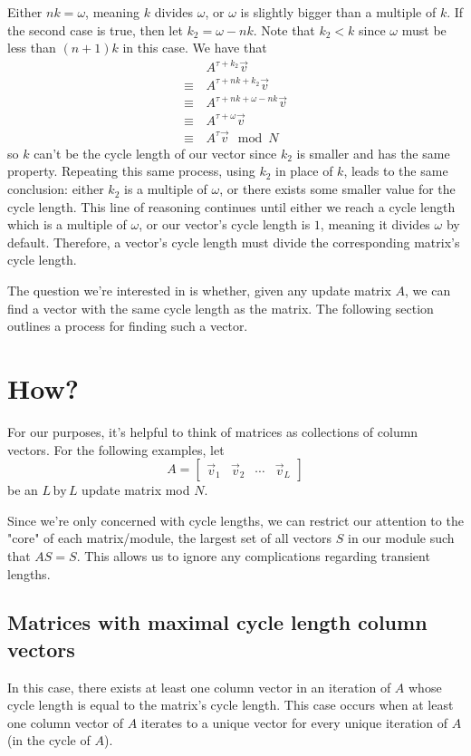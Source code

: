 \documentclass[a4paper, 12pt, reqno]{amsart}
\newcommand{\ssection}[1]{\vspace{1cm}\section{#1}}
\newcommand{\ssubsection}[1]{\vspace{0.25cm}\subsection{#1}}
\begin{document}
	Either $nk = \omega$, meaning $k$ divides $\omega$, or $\omega$ is slightly bigger than a multiple of $k$.
	If the second case is true, then let $k_{2} = \omega - nk$. Note that $k_{2} < k$ since $\omega$ must be
	less than $(n+1)k$ in this case. We have that
	\begin{align*}
		       & \, A^{\tau + k_{2}}\vec{v}            \\
		\equiv & \, A^{\tau + nk + k_{2}}\vec{v}       \\
		\equiv & \, A^{\tau + nk + \omega - nk}\vec{v} \\
		\equiv & \, A^{\tau + \omega}\vec{v}           \\
		\equiv & \, A^{\tau}\vec{v}                    \mod{N}
	\end{align*}
	so $k$ can't be the cycle length of our vector since $k_{2}$ is smaller and has the same property.
	Repeating this same process, using $k_{2}$ in place of $k$, leads to the same conclusion: either $k_{2}$
	is a multiple of $\omega$, or there exists some smaller value for the cycle length. This line of
	reasoning continues until either we reach a cycle length which is a multiple of $\omega$, or our
	vector's cycle length is $1$, meaning it divides $\omega$ by default. Therefore, a vector's cycle
	length must divide the corresponding matrix's cycle length.
	
	The question we're interested in is whether, given any update matrix $A$, we can find a vector
	with the same cycle length as the matrix. The following section outlines a process for finding
	such a vector.
	
	\ssection{How?}
	For our purposes, it's helpful to think of matrices as collections of column vectors. For the
	following examples, let
	\[
		A = 
		\begin{bmatrix}
			\vec{v}_{1} & \vec{v}_2 & \cdots & \vec{v}_L
		\end{bmatrix}
	\]
	be an $L \, \text{by} \, L$ update matrix mod $N$. 
	
	Since we're only concerned with cycle lengths, we can restrict our attention to the "core" 
	of each matrix/module, the largest set of all vectors $S$ in our module such that $AS = S$. This
	allows us to ignore any complications regarding transient lengths.

	\ssubsection{Matrices with maximal cycle length column vectors}
	In this case, there exists at least one column vector in an iteration of $A$ whose cycle length is 
	equal to the matrix's cycle length. This case occurs when at least one column vector of $A$ iterates 
	to a unique vector for every unique iteration of $A$ (in the cycle of $A$).
	
\end{document}
